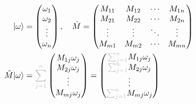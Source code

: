 \begin{align}
  \ket{\omega}         & = \begin{pmatrix}
                             \omega_1 \\
                             \omega_2 \\
                             \vdots   \\
                             \omega_n
                           \end{pmatrix}, \quad
  \hat{M} = \begin{pmatrix}
              M_{11} & M_{12} & \cdots & M_{1n} \\
              M_{21} & M_{22} & \cdots & M_{2n} \\
              \vdots & \vdots & \ddots & \vdots \\
              M_{m1} & M_{m2} & \cdots & M_{mn}
            \end{pmatrix}                                                                                               \\
  \hat{M} \ket{\omega} & =\textcolor{gray!50}{\sum_{j = 1}^{n}} \begin{pmatrix}
                                                                  M_{1j} \omega_j \\
                                                                  M_{2j} \omega_j \\
                                                                  \vdots          \\
                                                                  M_{mj} \omega_j
                                                                \end{pmatrix}  = \begin{pmatrix}
                                                                                   \textcolor{gray!50}{\sum_{j = 1}^{n}}M_{1j} \omega_j \\
                                                                                   \textcolor{gray!50}{\sum_{j = 1}^{n}}M_{2j} \omega_j \\
                                                                                   \vdots                                               \\
                                                                                   \textcolor{gray!50}{\sum_{j = 1}^{n}}M_{mj} \omega_j
                                                                                 \end{pmatrix}
\end{align}

